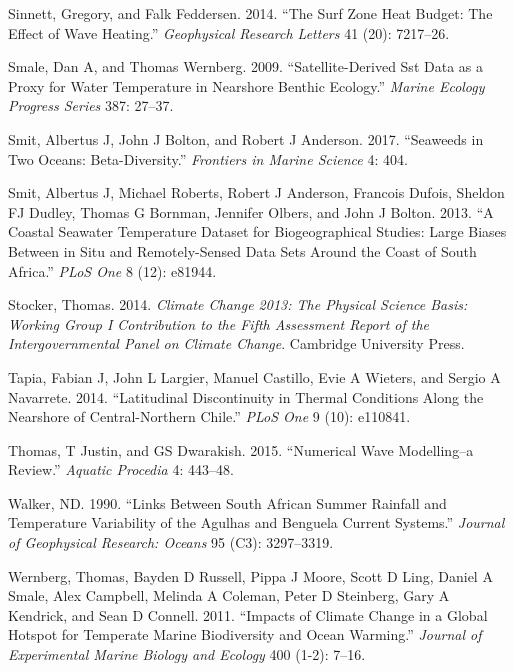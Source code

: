 \documentclass[10pt,a4paper,]{article}
\begin{document}
\leavevmode\hypertarget{ref-Sinnett2014}{}%
Sinnett, Gregory, and Falk Feddersen. 2014. ``The Surf Zone Heat Budget:
The Effect of Wave Heating.'' \emph{Geophysical Research Letters} 41
(20): 7217--26.

\leavevmode\hypertarget{ref-Smale2009}{}%
Smale, Dan A, and Thomas Wernberg. 2009. ``Satellite-Derived Sst Data as
a Proxy for Water Temperature in Nearshore Benthic Ecology.''
\emph{Marine Ecology Progress Series} 387: 27--37.

\leavevmode\hypertarget{ref-Smit2017}{}%
Smit, Albertus J, John J Bolton, and Robert J Anderson. 2017. ``Seaweeds
in Two Oceans: Beta-Diversity.'' \emph{Frontiers in Marine Science} 4:
404.

\leavevmode\hypertarget{ref-Smit2013}{}%
Smit, Albertus J, Michael Roberts, Robert J Anderson, Francois Dufois,
Sheldon FJ Dudley, Thomas G Bornman, Jennifer Olbers, and John J Bolton.
2013. ``A Coastal Seawater Temperature Dataset for Biogeographical
Studies: Large Biases Between in Situ and Remotely-Sensed Data Sets
Around the Coast of South Africa.'' \emph{PLoS One} 8 (12): e81944.

\leavevmode\hypertarget{ref-Stocker2014}{}%
Stocker, Thomas. 2014. \emph{Climate Change 2013: The Physical Science
Basis: Working Group I Contribution to the Fifth Assessment Report of
the Intergovernmental Panel on Climate Change}. Cambridge University
Press.

\leavevmode\hypertarget{ref-Tapia2014}{}%
Tapia, Fabian J, John L Largier, Manuel Castillo, Evie A Wieters, and
Sergio A Navarrete. 2014. ``Latitudinal Discontinuity in Thermal
Conditions Along the Nearshore of Central-Northern Chile.'' \emph{PLoS
One} 9 (10): e110841.

\leavevmode\hypertarget{ref-Thomas2015}{}%
Thomas, T Justin, and GS Dwarakish. 2015. ``Numerical Wave Modelling--a
Review.'' \emph{Aquatic Procedia} 4: 443--48.

\leavevmode\hypertarget{ref-Walker1990}{}%
Walker, ND. 1990. ``Links Between South African Summer Rainfall and
Temperature Variability of the Agulhas and Benguela Current Systems.''
\emph{Journal of Geophysical Research: Oceans} 95 (C3): 3297--3319.

\leavevmode\hypertarget{ref-Wernberg2011}{}%
Wernberg, Thomas, Bayden D Russell, Pippa J Moore, Scott D Ling, Daniel
A Smale, Alex Campbell, Melinda A Coleman, Peter D Steinberg, Gary A
Kendrick, and Sean D Connell. 2011. ``Impacts of Climate Change in a
Global Hotspot for Temperate Marine Biodiversity and Ocean Warming.''
\emph{Journal of Experimental Marine Biology and Ecology} 400 (1-2):
7--16.
\end{document}
